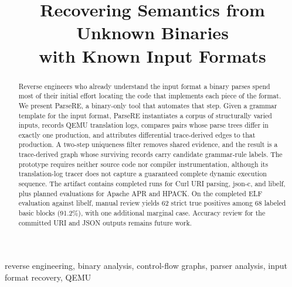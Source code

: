 \documentclass[conference,compsoc]{IEEEtran}
\newcommand{\toolname}{ParseRE\xspace}
\newcommand{\QEMU}{\textsc{QEMU}\xspace}
\begin{document}
\title{Recovering Semantics from Unknown Binaries\\with Known Input Formats}

\author{
}

\maketitle

\begin{abstract}
Reverse engineers who already understand the input format a binary parses spend most of their initial effort locating the code that implements each piece of the format.
We present \toolname, a binary-only tool that automates that step.
Given a grammar template for the input format, \toolname instantiates a corpus of structurally varied inputs, records \QEMU translation logs, compares pairs whose parse trees differ in exactly one production, and attributes differential trace-derived edges to that production.
A two-step uniqueness filter removes shared evidence, and the result is a trace-derived graph whose surviving records carry candidate grammar-rule labels.
The prototype requires neither source code nor compiler instrumentation, although its translation-log tracer does not capture a guaranteed complete dynamic execution sequence.
The artifact contains completed runs for Curl URI parsing, json-c, and libelf, plus planned evaluations for Apache APR and HPACK.
On the completed ELF evaluation against libelf, manual review yields 62 strict true positives among 68 labeled basic blocks (91.2\%), with one additional marginal case.
Accuracy review for the committed URI and JSON outputs remains future work.
\end{abstract}

\begin{IEEEkeywords}
reverse engineering, binary analysis, control-flow graphs, parser analysis, input format recovery, QEMU
\end{IEEEkeywords}










\balance


\end{document}
